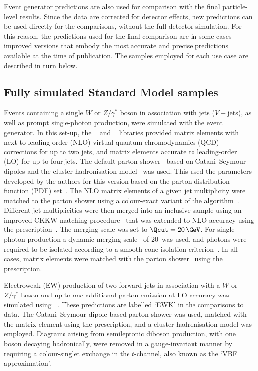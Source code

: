 \documentclass[atlasdraft=false, cernpreprint, UKenglish, texmf, orcidlogo]{atlasdoc}
\begin{document}
Event generator predictions are also used for comparison with the final particle-level results.
Since the data are corrected for detector effects, new predictions can be used directly for the comparisons, without the full detector simulation.
For this reason, the predictions used for the final comparison are in some cases improved versions that embody the most accurate and precise predictions available at the time of publication.
The samples employed for each use case are described in turn below.
 
\subsection{Fully simulated Standard Model samples}
 
Events containing a single $W$ or $Z/\gamma^\ast$ boson in association with jets ($V+$jets),
as well as prompt single-photon production, were simulated
with the \SHERPA[2.2.1]\cite{Gleisberg:2008ta} event generator. In this set-up,
the \OPENLOOPS~\cite{Cascioli:2011va,Denner:2016kdg} and
\Comix~\cite{Gleisberg:2008fv} libraries provided matrix elements
with next-to-leading-order (NLO) virtual quantum chromodynamics (QCD) corrections for up to two jets,
and matrix elements accurate to leading-order (LO) for up to four jets.
The default \SHERPA parton shower~\cite{Schumann:2007mg} based on
Catani--Seymour dipoles and the cluster hadronisation model~\cite{Winter:2003tt}
was used. This used the parameters developed by the
\SHERPA authors for this version based on the \NNPDF[3.0nnlo] parton distribution function (PDF) set~\cite{Ball:2014uwa}.
The NLO matrix elements of a given jet multiplicity were matched to the parton
shower using a colour-exact variant of the \MCatNLO
algorithm~\cite{Hoeche:2011fd}. Different jet multiplicities were then merged
into an inclusive sample using an improved CKKW matching
procedure~\cite{Catani:2001cc,Hoeche:2009rj} that was extended to NLO
accuracy using the \MEPSatNLO prescription~\cite{Hoeche:2011fd,Hoeche:2012yf,Catani:2001cc,Hoeche:2009rj}.
The merging scale
was set to $\Qcut=20\,\GeV$.
For single-photon production a dynamic merging scale~\cite{Siegert:2016bre} of 20~\GeV was used,
and photons were required to be isolated according to a smooth-cone isolation criterion~\cite{Frixione:1998jh}.
In all cases, matrix elements were matched
with the \SHERPA parton shower~\cite{Schumann:2007mg} using the \MEPSatNLO
prescription.
 
Electroweak (EW) production of two forward jets in association with a $W$ or $Z/\gamma^\ast$ boson
and up to one additional parton emission at LO accuracy was simulated using \SHERPA[2.2.11]~\cite{Bothmann:2019yzt}.
These predictions are labelled `EWK' in the comparisons to data.
The Catani--Seymour dipole-based parton shower was used, matched with the matrix element using the
\MEPSatLO prescription, and a cluster hadronisation model was employed.
Diagrams arising from semileptonic diboson production, with one boson decaying hadronically, were removed
in a gauge-invariant manner by requiring a colour-singlet exchange in the $t$-channel,
also known as the `VBF approximation'.
 
\end{document}
